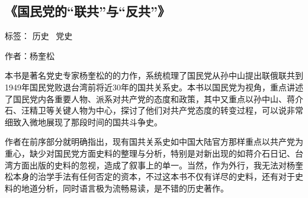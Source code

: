\subsection{《国民党的“联共”与“反共”》}

标签： 历史 \  党史

作者：杨奎松

本书是著名党史专家杨奎松的的力作，系统梳理了国民党从孙中山提出联俄联共到1949年国民党败退台湾前将近30年的国共关系史。本书以国民党为视角，重点讲述了国民党内各重要人物、派系对共产党的态度和政策，其中又重点以孙中山、蒋介石、汪精卫等关键人物为中心，探讨了他们对共产党态度的转变过程，可以说非常细致入微地展现了那段时间的国共斗争史。

作者在前序部分就明确指出，现有国共关系史如中国大陆官方那样重点以共产党为重心，缺少对国民党方面史料的整理与分析，特别是对新出现的如蒋介石日记、台湾方面出版的史料的忽视，造成了叙事上的单一。当然，作为外行，我无法对杨奎松本身的治学手法有任何否定的资本，不过这本书不仅有详尽的史料，还有对于史料的地道分析，同时语言极为流畅易读，是不错的历史著作。


